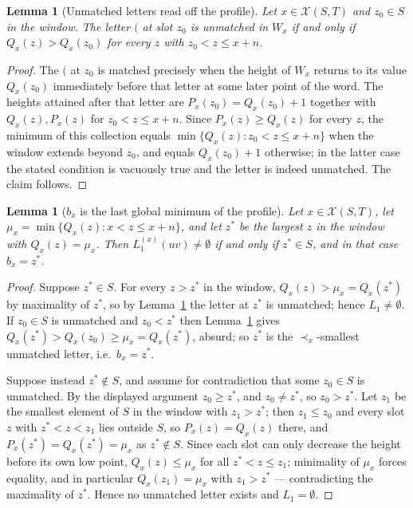 \documentclass[11pt]{article}
\newtheorem{lem}[thm]{Lemma}
\theoremstyle{definition}
\newcommand{\XX}{\mathcal{X}}
\begin{document}
\begin{lem}[Unmatched letters read off the profile]\label{lem:unmatched}
Let $x\in\XX(S,T)$ and $z_0\in S$ in the window. The letter $\texttt{(}$ at slot $z_0$ is
unmatched in $W_x$ if and only if $Q_x(z)>Q_x(z_0)$ for every $z$ with $z_0<z\le x+n$.
\end{lem}

\begin{proof}
The $\texttt{(}$ at $z_0$ is matched precisely when the height of $W_x$ returns to its value
$Q_x(z_0)$ immediately before that letter at some later point of the word. The heights attained
after that letter are $P_x(z_0)=Q_x(z_0)+1$ together with $Q_x(z),P_x(z)$ for $z_0<z\le x+n$.
Since $P_x(z)\ge Q_x(z)$ for every $z$, the minimum of this collection equals
$\min\{Q_x(z):z_0<z\le x+n\}$ when the window extends beyond $z_0$, and equals $Q_x(z_0)+1$
otherwise; in the latter case the stated condition is vacuously true and the letter is indeed
unmatched. The claim follows.
\end{proof}

\begin{lem}[$b_x$ is the last global minimum of the profile]\label{lem:bx}
Let $x\in\XX(S,T)$, let $\mu_x=\min\{Q_x(z):x<z\le x+n\}$, and let $z^{*}$ be the largest $z$
in the window with $Q_x(z)=\mu_x$. Then $L_1^{(x)}(uv)\neq\emptyset$ if and only if
$z^{*}\in S$, and in that case $b_x=z^{*}$.
\end{lem}

\begin{proof}
Suppose $z^{*}\in S$. For every $z>z^{*}$ in the window, $Q_x(z)>\mu_x=Q_x(z^{*})$ by
maximality of $z^{*}$, so by Lemma~\ref{lem:unmatched} the letter at $z^{*}$ is unmatched;
hence $L_1\ne\emptyset$. If $z_0\in S$ is unmatched and $z_0<z^{*}$ then
Lemma~\ref{lem:unmatched} gives $Q_x(z^{*})>Q_x(z_0)\ge\mu_x=Q_x(z^{*})$, absurd; so $z^{*}$ is
the $\prec_x$-smallest unmatched letter, i.e.\ $b_x=z^{*}$.

Suppose instead $z^{*}\notin S$, and assume for contradiction that some $z_0\in S$ is
unmatched. By the displayed argument $z_0\ge z^{*}$, and $z_0\ne z^{*}$, so $z_0>z^{*}$. Let
$z_1$ be the smallest element of $S$ in the window with $z_1>z^{*}$; then $z_1\le z_0$ and every
slot $z$ with $z^{*}<z<z_1$ lies outside $S$, so $P_x(z)=Q_x(z)$ there, and
$P_x(z^{*})=Q_x(z^{*})=\mu_x$ as $z^{*}\notin S$. Since each slot can only decrease the height
before its own low point, $Q_x(z)\le\mu_x$ for all $z^{*}<z\le z_1$; minimality of $\mu_x$
forces equality, and in particular $Q_x(z_1)=\mu_x$ with $z_1>z^{*}$ --- contradicting the
maximality of $z^{*}$. Hence no unmatched letter exists and $L_1=\emptyset$.
\end{proof}
\end{document}
